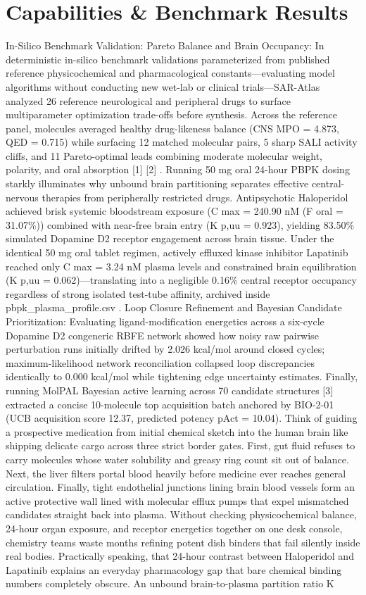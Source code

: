 \documentclass[10pt,letterpaper]{article}
\begin{document}
\section{Capabilities \& Benchmark Results}
In-Silico Benchmark Validation: Pareto Balance and Brain Occupancy: In deterministic in-silico benchmark validations parameterized from published reference physicochemical and pharmacological constants---evaluating model algorithms without conducting new wet-lab or clinical trials---SAR-Atlas analyzed 26 reference neurological and peripheral drugs to surface multiparameter optimization trade-offs before synthesis. Across the reference panel, molecules averaged healthy drug-likeness balance (CNS MPO = 4.873, QED = 0.715) while surfacing 12 matched molecular pairs, 5 sharp SALI activity cliffs, and 11 Pareto-optimal leads combining moderate molecular weight, polarity, and oral absorption [1] [2] . Running 50 mg oral 24-hour PBPK dosing starkly illuminates why unbound brain partitioning separates effective central-nervous therapies from peripherally restricted drugs. Antipsychotic Haloperidol achieved brisk systemic bloodstream exposure (C max = 240.90 nM (F oral = 31.07\%)) combined with near-free brain entry (K p,uu = 0.923), yielding 83.50\% simulated Dopamine D2 receptor engagement across brain tissue. Under the identical 50 mg oral tablet regimen, actively effluxed kinase inhibitor Lapatinib reached only C max = 3.24 nM plasma levels and constrained brain equilibration (K p,uu = 0.062)---translating into a negligible 0.16\% central receptor occupancy regardless of strong isolated test-tube affinity, archived inside pbpk\_plasma\_profile.csv . Loop Closure Refinement and Bayesian Candidate Prioritization: Evaluating ligand-modification energetics across a six-cycle Dopamine D2 congeneric RBFE network showed how noisy raw pairwise perturbation runs initially drifted by 2.026 kcal/mol around closed cycles; maximum-likelihood network reconciliation collapsed loop discrepancies identically to 0.000 kcal/mol while tightening edge uncertainty estimates. Finally, running MolPAL Bayesian active learning across 70 candidate structures [3] extracted a concise 10-molecule top acquisition batch anchored by BIO-2-01 (UCB acquisition score 12.37, predicted potency pAct = 10.04). Think of guiding a prospective medication from initial chemical sketch into the human brain like shipping delicate cargo across three strict border gates. First, gut fluid refuses to carry molecules whose water solubility and greasy ring count sit out of balance. Next, the liver filters portal blood heavily before medicine ever reaches general circulation. Finally, tight endothelial junctions lining brain blood vessels form an active protective wall lined with molecular efflux pumps that expel mismatched candidates straight back into plasma. Without checking physicochemical balance, 24-hour organ exposure, and receptor energetics together on one desk console, chemistry teams waste months refining potent dish binders that fail silently inside real bodies. Practically speaking, that 24-hour contrast between Haloperidol and Lapatinib explains an everyday pharmacology gap that bare chemical binding numbers completely obscure. An unbound brain-to-plasma partition ratio K 
\end{document}
